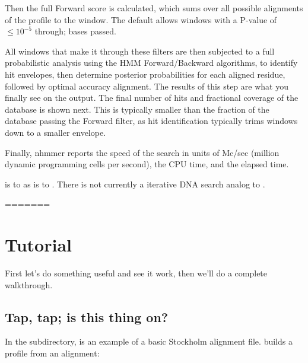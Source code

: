 Then the full Forward score is calculated, which sums over all
possible alignments of the profile to the window. The default allows
windows with a P-value of $\leq 10^{-5}$ through; \NMHnfwd{} bases
passed.

All windows that make it through these filters are then subjected to a
full probabilistic analysis using the HMM Forward/Backward algorithms,
to identify hit envelopes, then determine posterior probabilities for
each aligned residue, followed by optimal accuracy alignment. The
results of this step are what you finally see on the output. The final
number of hits and fractional coverage of the database is shown
next. This is typically smaller than the fraction of the database
passing the Forward filter, as hit identification typically trims
windows down to a smaller envelope.

Finally, nhmmer reports the speed of the search in units of Mc/sec
(million dynamic programming cells per second), the CPU time, and the
elapsed time.

 is to  as  is to
.  There is not currently a iterative DNA search
analog to .







=======

\chapter{Tutorial}
\label{chapter:tutorial}
\setcounter{footnote}{0}



First let's do something useful and see it work, then we'll do a
complete walkthrough.

\section{Tap, tap; is this thing on?}

In the  subdirectory,  is an example
of a basic Stockholm alignment file.  builds a profile
from an alignment:

